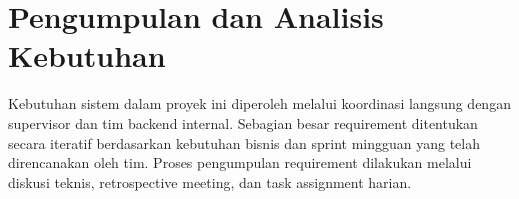 


\section{Pengumpulan dan Analisis Kebutuhan}
Kebutuhan sistem dalam proyek ini diperoleh melalui koordinasi langsung dengan supervisor dan tim backend internal. Sebagian besar requirement ditentukan secara iteratif berdasarkan kebutuhan bisnis dan sprint mingguan yang telah direncanakan oleh tim. Proses pengumpulan requirement dilakukan melalui diskusi teknis, retrospective meeting, dan task assignment harian.

